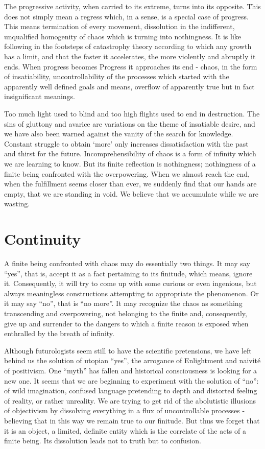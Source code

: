 The progressive activity, when carried to its extreme, turns into its opposite.
This does not simply mean a regress which, in a sense, is a special case of 
progress. This means termination of every movement, dissolution in the 
indifferent, unqualified homogenity of chaos which is turning into nothingness.
It is like following in the footsteps of catastrophy theory according to which
any growth has a limit, and that the faster it accelerates, the more
violently and abruptly it ends.
When progress becomes Progress it approaches its end - chaos, in the form of
insatiability, uncontrollability of the processes which started with the 
apparently  well defined goals and means, overflow of apparently true but
in fact insignificant meanings.

Too much light used to blind and too high flights used to end in destruction.
The sins of gluttony and avarice are variations on the theme of insatiable
desire, and we have also been warned against the vanity of the search for
knowledge. Constant struggle to obtain `more' only increases dissatisfaction
with the past and thirst for the future. Incomprehensibility of chaos is a 
form of infinity 
which we are learning to know. But its finite reflection is nothingness; 
nothingness of a finite being confronted with the overpowering. When we almost
reach the end, when the fulfillment seems closer than ever, we suddenly find 
that our hands are empty, that we are standing in void. We believe that we 
accumulate while we are wasting.

\section{Continuity}
A finite being confronted with chaos may do essentially two things. It may
say ``yes'', that is, accept it as a fact pertaining to its finitude, which 
means, ignore it. Consequently, it will
try to come up with some curious or even ingenious, but always meaningless
 constructions attempting to appropriate the phenomenon. Or it may
say ``no'', that is ``no more''. It may recognize the chaos as something 
transcending and overpowering, not belonging to the finite and, consequently,
give up and surrender to the dangers to which a finite reason is
exposed when enthralled by the breath of infinity.

Although futurologists seem still to have the scientific pretensions, 
we have left behind us the solution of utopian ``yes'', the arrogance of 
Enlightment and naivit\'{e} of positivism. One ``myth'' has fallen and 
historical consciousness is looking for a new one. It seems that we are 
beginning to experiment with the solution of ``no'':
of wild imagination, confused language pretending to depth 
and distorted feeling of reality, or rather unreality.
We are trying to get rid of the abolutistic illusions of objectivism by 
dissolving everything in a flux of uncontrollable processes - believing that 
in this way we remain true to our finitude. But thus we forget that it is an
object, a limited, definite entity which is the correlate of the acts of a 
finite being. Its dissolution leads not to truth but to confusion.

